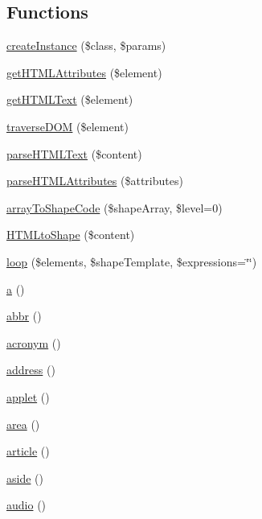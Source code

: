 \subsection*{Functions}
\begin{DoxyCompactItemize}
\item 
\hyperlink{Shape_8php_a73fc62a07cc6f1fece31988210211f9b}{create\+Instance} (\$class, \$params)
\item 
\hyperlink{Shape_8php_a2ff0a84895d55c347f8ebed8eacb5cd0}{get\+H\+T\+M\+L\+Attributes} (\$element)
\item 
\hyperlink{Shape_8php_a4e6d621165472a8472beb5cb195147b9}{get\+H\+T\+M\+L\+Text} (\$element)
\item 
\hyperlink{Shape_8php_a70e789b8c369d92a4458fa7937103383}{traverse\+D\+O\+M} (\$element)
\item 
\hyperlink{Shape_8php_a7a9ab2e0861beff8ee1e0a79fbf604e0}{parse\+H\+T\+M\+L\+Text} (\$content)
\item 
\hyperlink{Shape_8php_afad17d48de54b5a9d5f668142dee7345}{parse\+H\+T\+M\+L\+Attributes} (\$attributes)
\item 
\hyperlink{Shape_8php_a8d9adfbb67ce8b0b32ae6b8305ece75d}{array\+To\+Shape\+Code} (\$shape\+Array, \$level=0)
\item 
\hyperlink{Shape_8php_ab2661de1c01963ecfd0a48068f042da4}{H\+T\+M\+Lto\+Shape} (\$content)
\item 
\hyperlink{Shape_8php_ac08023e5af20ba837efccd1410585aaa}{loop} (\$elements, \$shape\+Template, \$expressions=\char`\"{}\char`\"{})
\item 
\hyperlink{Shape_8php_a868083704107d6d05b69983f62cce171}{a} ()
\item 
\hyperlink{Shape_8php_a6dad20e33fe4af412f1c0d8771995b0b}{abbr} ()
\item 
\hyperlink{Shape_8php_a2075525e48398c40aed318fdf73fb424}{acronym} ()
\item 
\hyperlink{Shape_8php_af7b3db82ea76900bf0727eeeab10a489}{address} ()
\item 
\hyperlink{Shape_8php_aa2a1ca5a4c3659e39c9a075de6a42a6f}{applet} ()
\item 
\hyperlink{Shape_8php_a75033b1ec56a7593e1a0add7e73376ef}{area} ()
\item 
\hyperlink{Shape_8php_a2b6a73e4cdfb573dc4203e34e0689223}{article} ()
\item 
\hyperlink{Shape_8php_a6d5f9ee24600ea1e59752bc91bfca29a}{aside} ()
\item 
\hyperlink{Shape_8php_a0b300de37d1246eac0c4d2de4afd5856}{audio} ()

\end{DoxyCompactItemize}
